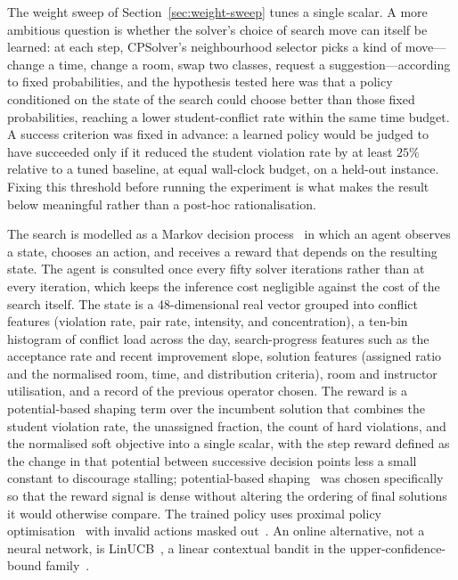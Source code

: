 \documentclass[journal]{IEEEtran}
\begin{document}
The weight sweep of Section~\ref{sec:weight-sweep} tunes a single scalar. A more ambitious question is whether the solver's choice of search move can itself be learned: at each step, CPSolver's neighbourhood selector picks a kind of move---change a time, change a room, swap two classes, request a suggestion---according to fixed probabilities, and the hypothesis tested here was that a policy conditioned on the state of the search could choose better than those fixed probabilities, reaching a lower student-conflict rate within the same time budget. A success criterion was fixed in advance: a learned policy would be judged to have succeeded only if it reduced the student violation rate by at least $25\%$ relative to a tuned baseline, at equal wall-clock budget, on a held-out instance. Fixing this threshold before running the experiment is what makes the result below meaningful rather than a post-hoc rationalisation.

The search is modelled as a Markov decision process~\cite{sutton2018rl} in which an agent observes a state, chooses an action, and receives a reward that depends on the resulting state. The agent is consulted once every fifty solver iterations rather than at every iteration, which keeps the inference cost negligible against the cost of the search itself. The state is a 48-dimensional real vector grouped into conflict features (violation rate, pair rate, intensity, and concentration), a ten-bin histogram of conflict load across the day, search-progress features such as the acceptance rate and recent improvement slope, solution features (assigned ratio and the normalised room, time, and distribution criteria), room and instructor utilisation, and a record of the previous operator chosen. The reward is a potential-based shaping term over the incumbent solution that combines the student violation rate, the unassigned fraction, the count of hard violations, and the normalised soft objective into a single scalar, with the step reward defined as the change in that potential between successive decision points less a small constant to discourage stalling; potential-based shaping~\cite{ng1999shaping} was chosen specifically so that the reward signal is dense without altering the ordering of final solutions it would otherwise compare. The trained policy uses proximal policy optimisation~\cite{schulman2017ppo} with invalid actions masked out~\cite{schulte2017maskable}. An online alternative, not a neural network, is LinUCB~\cite{li2010linucb}, a linear contextual bandit in the upper-confidence-bound family~\cite{auer2002ucb}.
\end{document}
